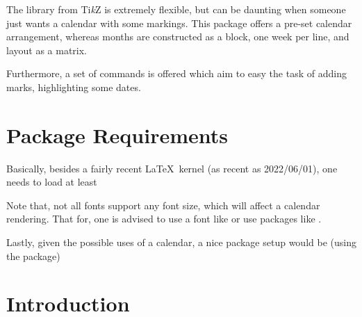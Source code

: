 \documentclass{article}
\begin{document}
  

\begin{typesetabstract}

The  library from Ti\emph{k}Z is extremely flexible, but can be daunting when someone just wants a calendar with some markings. This package offers a pre-set calendar arrangement, whereas months are constructed as a block, one week per line, and layout as a matrix.

Furthermore, a set of commands is offered which aim to easy the task of adding marks, highlighting some dates.

\end{typesetabstract}

\tableofcontents

\section{Package Requirements}
Basically, besides a fairly recent \LaTeX\ kernel (as recent as 2022/06/01), one needs to load at least 
\begin{codestore}[prereq]
\usepackage{tikz}
\usetikzlibrary{calendar}
\end{codestore}

Note that, not all fonts support any font size, which will affect a calendar rendering. That for, one is advised to use a font like  or use packages like .

\newpage
Lastly, given the possible uses of a calendar, a nice package setup would be (using the  package)

\begin{codestore}[setup]
\usepackage{tikz}
\usetikzlibrary{calendar}

\RequirePackage{lmodern}

\usepackage{tikzcalendarnotes}

\usepackage[active , tightpage]{preview}
\setlength\PreviewBorder{5pt}
\end{codestore}



\section{Introduction}
\end{document}
